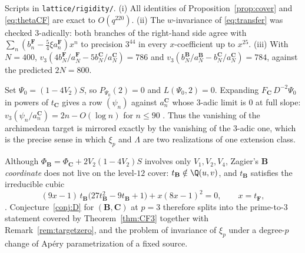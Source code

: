 \begin{verification}\label{ver:transfer}
Scripts in \texttt{lattice/rigidity/}.  (i) All identities of
Proposition~\ref{prop:cover} and \eqref{eq:thetaCF} are exact to $O(q^{220})$.
(ii) The $w$-invariance of \eqref{eq:transfer} was checked $3$-adically: both
branches of the right-hand side agree with
$\sum_n(b_n^{\mathbf F}-\tfrac54\xi a_n^{\mathbf F})x^n$ to precision $3^{44}$ in
every $x$-coefficient up to $x^{25}$.  (iii) With $N=400$,
$v_3(4b_N^{\mathbf F}/a_N^{\mathbf F}-5b_N^{\mathbf C}/a_N^{\mathbf C})=786$ and
$v_3(b^{\mathbf B}_N/a^{\mathbf B}_N-b^{\mathbf C}_N/a^{\mathbf C}_N)=784$, against
the predicted $2N=800$.
\end{verification}

\begin{remark}\label{rem:targetzero}
Set $\Psi_0=(1-4V_2)S$, so $P_{\Psi_0}(2)=0$ and $L(\Psi_0,2)=0$.  Expanding
$F_{\mathbf C}\,D^{-2}\Psi_0$ in powers of $t_{\mathbf C}$ gives a row $(\psi_n)$
against $a^{\mathbf C}_n$ whose $3$-adic limit is $0$ at full slope:
$v_3(\psi_n/a^{\mathbf C}_n)=2n-O(\log n)$ for $n\le90$
.  Thus the vanishing of the archimedean target is mirrored
exactly by the vanishing of the $3$-adic one, which is the precise sense in which
$\xi_p$ and $\Lambda$ are two realizations of one extension class.
\end{remark}

\begin{remark}\label{rem:Bcubic}
Although $\Phi_{\mathbf B}=\Phi_{\mathbf C}+2V_2(1-4V_2)S$ involves only $V_1,V_2,V_4$,
Zagier's $\mathbf B$ \emph{coordinate} does not live on the level-$12$ cover:
$t_{\mathbf B}\notin\Q(u,v)$, and $t_{\mathbf B}$ satisfies the irreducible cubic
\[
(9x-1)\,t_{\mathbf B}\bigl(27t_{\mathbf B}^2-9t_{\mathbf B}+1\bigr)+x(8x-1)^2=0,
\qquad x=t_{\mathbf F},
\]
.  Conjecture~\ref{conj:D} for $(\mathbf B,\mathbf C)$ at $p=3$
therefore splits into the prime-to-$3$ statement covered by
Theorem~\ref{thm:CF3} together with Remark~\ref{rem:targetzero}, and the
\Open{} problem of invariance of $\xi_p$ under a degree-$p$ change of Ap\'ery
parametrization of a fixed source.
\end{remark}

